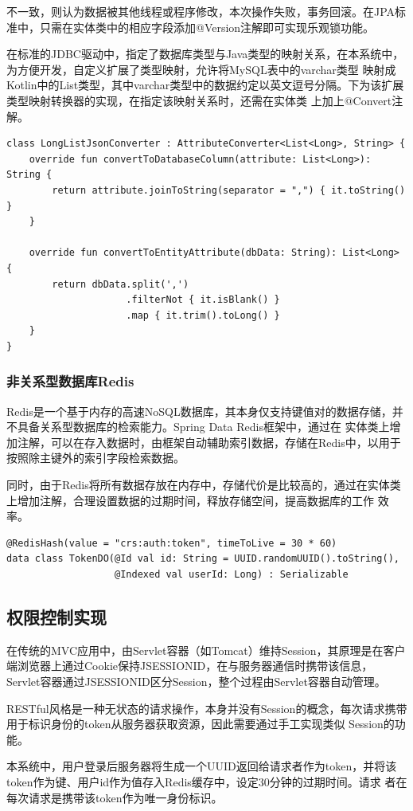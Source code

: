 \documentclass[titlepage,UTF8,linespread=1.5]{ctexart}
\begin{document}
不一致，则认为数据被其他线程或程序修改，本次操作失败，事务回滚。在JPA标准中，只需在实体类中的相应字段添加@Version注解即可实现乐观锁功能。\par
在标准的JDBC驱动中，指定了数据库类型与Java类型的映射关系，在本系统中，为方便开发，自定义扩展了类型映射，允许将MySQL表中的varchar类型
映射成Kotlin中的List类型，其中varchar类型中的数据约定以英文逗号分隔。下为该扩展类型映射转换器的实现，在指定该映射关系时，还需在实体类
上加上@Convert注解。\par
\begin{mdframed}\begin{verbatim}
class LongListJsonConverter : AttributeConverter<List<Long>, String> {
    override fun convertToDatabaseColumn(attribute: List<Long>): String {
        return attribute.joinToString(separator = ",") { it.toString() }
    }

    override fun convertToEntityAttribute(dbData: String): List<Long> {
        return dbData.split(',')
                     .filterNot { it.isBlank() }
                     .map { it.trim().toLong() }
    }
}
\end{verbatim}\end{mdframed}\par

\subsubsection{非关系型数据库Redis}
Redis是一个基于内存的高速NoSQL数据库，其本身仅支持键值对的数据存储，并不具备关系型数据库的检索能力。Spring Data Redis框架中，通过在
实体类上增加注解，可以在存入数据时，由框架自动辅助索引数据，存储在Redis中，以用于按照除主键外的索引字段检索数据。\par
同时，由于Redis将所有数据存放在内存中，存储代价是比较高的，通过在实体类上增加注解，合理设置数据的过期时间，释放存储空间，提高数据库的工作
效率。\par
\begin{mdframed}\begin{verbatim}
@RedisHash(value = "crs:auth:token", timeToLive = 30 * 60)
data class TokenDO(@Id val id: String = UUID.randomUUID().toString(),
                   @Indexed val userId: Long) : Serializable
\end{verbatim}\end{mdframed}\par

\subsection{权限控制实现}
在传统的MVC应用中，由Servlet容器（如Tomcat）维持Session，其原理是在客户端浏览器上通过Cookie保持JSESSIONID，在与服务器通信时携带该信息，
Servlet容器通过JSESSIONID区分Session，整个过程由Servlet容器自动管理。\par
RESTful风格是一种无状态的请求操作，本身并没有Session的概念，每次请求携带用于标识身份的token从服务器获取资源，因此需要通过手工实现类似
Session的功能。\par
本系统中，用户登录后服务器将生成一个UUID返回给请求者作为token，并将该token作为键、用户id作为值存入Redis缓存中，设定30分钟的过期时间。请求
者在每次请求是携带该token作为唯一身份标识。\par
\end{document}
